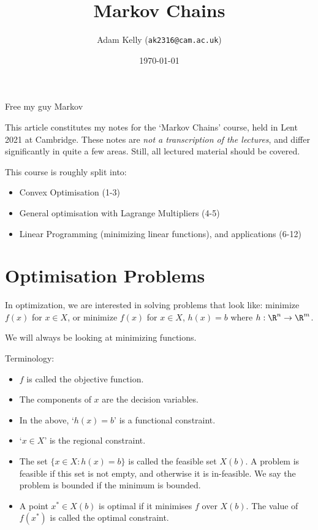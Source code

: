 \documentclass[a4paper]{scrartcl}
\title{Markov Chains}
\author{Adam Kelly (\texttt{ak2316@cam.ac.uk})}
\date{\today}
\begin{document}
\maketitle

Free my guy Markov

This article constitutes my notes for the `Markov Chains' course, held in Lent 2021 at Cambridge. These notes are \emph{not a transcription of the lectures}, and differ significantly in quite a few areas. Still, all lectured material should be covered.


\tableofcontents


This course is roughly split into:
\begin{itemize}
	\item Convex Optimisation (1-3)
	\item General optimisation with Lagrange Multipliers (4-5)
	\item Linear Programming (minimizing linear functions), and applications (6-12)
\end{itemize}

\section{Optimisation Problems}

In optimization, we are interested in solving problems that look like:
minimize $f(x)$ for $x \in X$, or minimize $f(x)$ for $x \in X$, $h(x) = b$ where $h : \R^n \rightarrow \R^m$.

We will always be looking at minimizing functions.

Terminology:
\begin{itemize}
	\item $f$ is called the objective function. 
	\item The components of $x$ are the decision variables.
	\item In the above, `$h(x) = b$' is a functional constraint.
	\item `$x \in X$' is the regional constraint.
	\item The set $\{x \in X : h(x) = b\}$ is called the feasible set $X(b)$. A problem is feasible if this set is not empty, and otherwise it is in-feasible. We say the problem is bounded if the minimum is bounded.
	\item A point $x^* \in X(b)$ is optimal if it minimises $f$ over $X(b)$. The value of $f(x^*)$ is called the optimal constraint.
\end{itemize}
\end{document}

